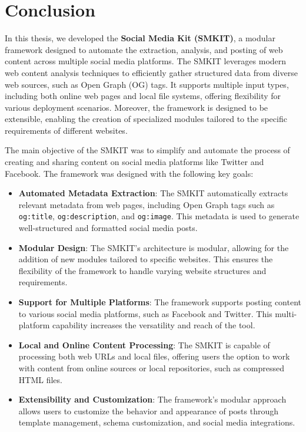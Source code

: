 
\chapter{Conclusion}
\label{chp:conclusion}
In this thesis, we developed the \textbf{Social Media Kit (SMKIT)}, a modular framework designed to automate the extraction, analysis, and posting of web content across multiple social media platforms. The SMKIT leverages modern web content analysis techniques to efficiently gather structured data from diverse web sources, such as Open Graph (OG) tags. It supports multiple input types, including both online web pages and local file systems, offering flexibility for various deployment scenarios. Moreover, the framework is designed to be extensible, enabling the creation of specialized modules tailored to the specific requirements of different websites.

The main objective of the SMKIT was to simplify and automate the process of creating and sharing content on social media platforms like Twitter and Facebook. The framework was designed with the following key goals:

\begin{itemize}
    \item \textbf{Automated Metadata Extraction}: The SMKIT automatically extracts relevant metadata from web pages, including Open Graph tags such as \texttt{og:title}, \texttt{og:description}, and \texttt{og:image}. This metadata is used to generate well-structured and formatted social media posts.
    \item \textbf{Modular Design}: The SMKIT's architecture is modular, allowing for the addition of new modules tailored to specific websites. This ensures the flexibility of the framework to handle varying website structures and requirements.
    \item \textbf{Support for Multiple Platforms}: The framework supports posting content to various social media platforms, such as Facebook and Twitter. This multi-platform capability increases the versatility and reach of the tool.
    \item \textbf{Local and Online Content Processing}: The SMKIT is capable of processing both web URLs and local files, offering users the option to work with content from online sources or local repositories, such as compressed HTML files.
    \item \textbf{Extensibility and Customization}: The framework's modular approach allows users to customize the behavior and appearance of posts through template management, schema customization, and social media integrations.
\end{itemize}

